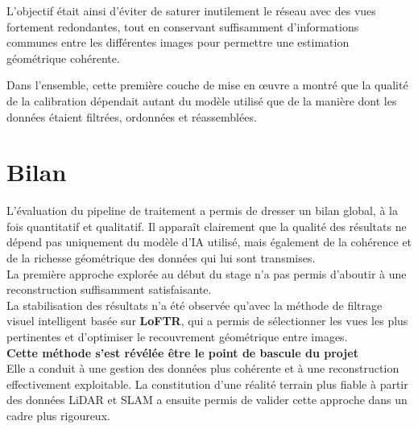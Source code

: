 \documentclass[12pt,a4paper,oneside]{report}
\begin{document}
\hspace*{.3cm}L'objectif était ainsi d'éviter de saturer inutilement le réseau avec des vues fortement redondantes, tout en conservant suffisamment d'informations communes entre les différentes images pour permettre une estimation géométrique cohérente.

\par\bigskip
\par\bigskip

\hspace*{.3cm}Dans l'ensemble, cette première couche de mise en œuvre a montré que la qualité de la calibration dépendait autant du modèle utilisé que de la manière dont les données étaient filtrées, ordonnées et réassemblées.

\newpage

\section{Bilan}

\hspace*{0.3cm}L'évaluation du pipeline de traitement a permis de dresser un bilan global, à la fois quantitatif et qualitatif. Il apparaît clairement que la qualité des résultats ne dépend pas uniquement du modèle d'IA utilisé, mais également de la cohérence et de la richesse géométrique des données qui lui sont transmises.\\

\hspace*{.3cm}La première approche explorée au début du stage n'a pas permis d'aboutir à une reconstruction suffisamment satisfaisante.\\
\hspace*{0.3cm} La stabilisation des résultats n'a été observée qu'avec la méthode de filtrage visuel intelligent basée sur \textbf{LoFTR}, qui a permis de sélectionner les vues les plus pertinentes et d'optimiser le recouvrement géométrique entre images. \\
\hspace*{1cm} \textbf{Cette méthode s'est révélée être le point de bascule du projet}\\

\hspace*{0.3cm}Elle a conduit à une gestion des données plus cohérente et à une reconstruction effectivement exploitable. La constitution d'une réalité terrain plus fiable à partir des données LiDAR et SLAM a ensuite permis de valider cette approche dans un cadre plus rigoureux.\\
\end{document}
